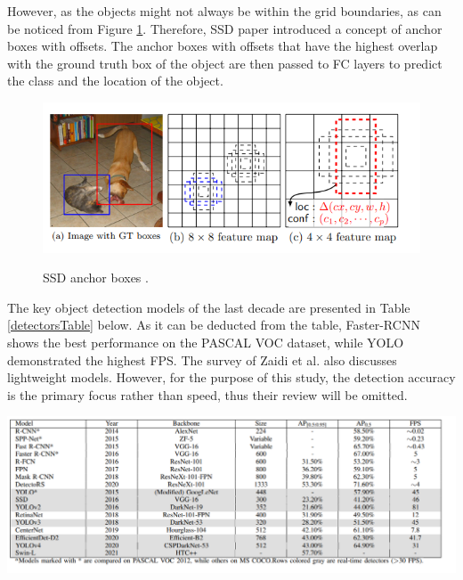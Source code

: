 However, as the objects might not always be within the grid boundaries, as can be noticed from Figure \ref{ssd_boxes}. Therefore, SSD paper introduced a concept of anchor boxes with offsets. The anchor boxes with offsets that have the highest overlap with the ground truth box of the object are then passed to FC layers to predict the class and the location of the object. 

\begin{figure}[htb]
	\begin{center}
		\includegraphics[width=12cm]{./ssd_boxes.png}
	\end{center}
	\caption{SSD anchor boxes \cite{Liu2015}.}
	\begin{center}
		\label{ssd_boxes}
	\end{center}
\end{figure}
\FloatBarrier

The key object detection models of the last decade are presented in Table \ref{detectorsTable} below. As it can be deducted from the table, Faster-RCNN shows the best performance on the PASCAL VOC dataset, while YOLO demonstrated the highest FPS. The survey of Zaidi et al. \cite{Zaidi2021} also discusses lightweight models. However, for the purpose of this study, the detection accuracy is the primary focus rather than speed, thus their review will be omitted. 

\begin{table}[htb]
	\begin{center}
		\includegraphics[width=16cm]{./detectorsTable.png}
	\end{center}
	\begin{center}
		\label{detectorsTable}
	\end{center}
\end{table}
\FloatBarrier

